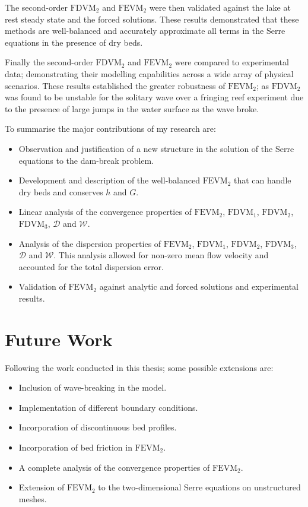 The second-order $\text{FDVM}_2$ and $\text{FEVM}_2$ were then validated against the lake at rest steady state and the forced solutions. These results demonstrated that these methods are well-balanced and accurately approximate all terms in the Serre equations in the presence of dry beds. 

Finally the second-order $\text{FDVM}_2$ and $\text{FEVM}_2$ were compared to experimental data; demonstrating their modelling capabilities across a wide array of physical scenarios. These results established the greater robustness of $\text{FEVM}_2$; as $\text{FDVM}_2$ was found to be unstable for the solitary wave over a fringing reef experiment due to the presence of large jumps in the water surface as the wave broke. 

To summarise the major contributions of my research are:
\begin{itemize}
	\item Observation and justification of a new structure in the solution of the Serre equations to the dam-break problem.
	\item Development and description of the well-balanced $\text{FEVM}_2$ that can handle dry beds and conserves $h$ and $G$.
	\item Linear analysis of the convergence properties of $\text{FEVM}_2$, $\text{FDVM}_1$, $\text{FDVM}_2$, $\text{FDVM}_3$, $\mathcal{D}$ and $\mathcal{W}$.
	\item Analysis of the dispersion properties of $\text{FEVM}_2$, $\text{FDVM}_1$, $\text{FDVM}_2$, $\text{FDVM}_3$, $\mathcal{D}$ and $\mathcal{W}$. This analysis allowed for non-zero mean flow velocity and accounted for the total dispersion error.
	\item Validation of $\text{FEVM}_2$ against analytic and forced solutions and experimental results. 
\end{itemize}

\section{Future Work}
Following the work conducted in this thesis; some possible extensions are:
\begin{itemize}
	\item Inclusion of wave-breaking in the model.  %
	\item Implementation of different boundary conditions.
	\item Incorporation of discontinuous bed profiles.
	\item Incorporation of bed friction in $\text{FEVM}_2$.
	\item A complete analysis of the convergence properties of $\text{FEVM}_2$.
	\item Extension of $\text{FEVM}_2$ to the two-dimensional Serre equations on unstructured meshes.
\end{itemize}




